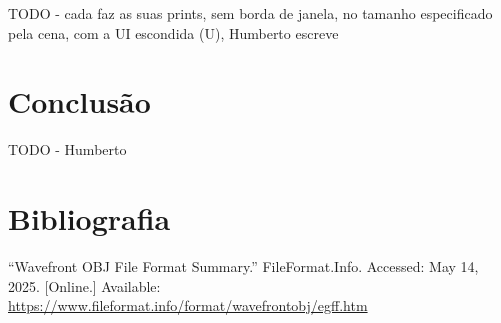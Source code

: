\documentclass[12pt, a4paper]{article}
\begin{document}
{\color{red} TODO - cada faz as suas prints, sem borda de janela, no tamanho especificado pela cena,
com a UI escondida (U), Humberto escreve}

\section{Conclusão}

{\color{red} TODO - Humberto}

\begingroup
\section{Bibliografia}
\renewcommand{\section}[2]{}

\begin{thebibliography}{9}
        ``Wavefront OBJ File Format Summary.''{} FileFormat.Info. Accessed: May 14, 2025. [Online.]
        Available: \url{https://www.fileformat.info/format/wavefrontobj/egff.htm}
\end{thebibliography}
\endgroup
\end{document}
